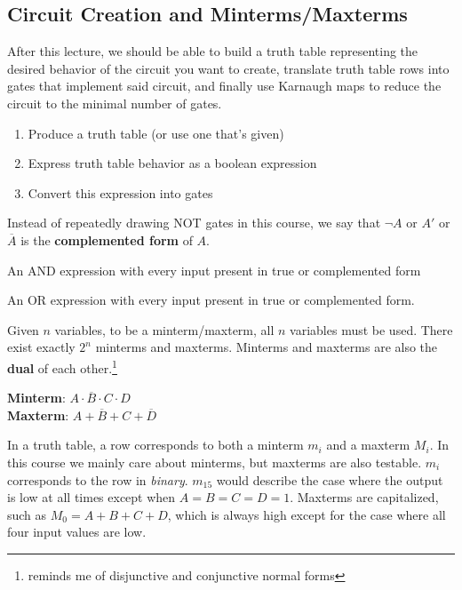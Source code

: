 \subsection{Circuit Creation and Minterms/Maxterms} \label{part:5stepplan}

After this lecture, we should be able to build a truth table representing the desired behavior of the circuit you want to create, translate truth table rows into gates that implement said circuit, and finally use Karnaugh maps to reduce the circuit to the minimal number of gates.
\begin{enumerate}
    \item Produce a truth table (or use one that's given)
    \item Express truth table behavior as a boolean expression
    \item Convert this expression into gates
\end{enumerate}

Instead of repeatedly drawing NOT gates in this course, we say that $\neg A$ or $A'$ or $\overline{A}$ is the \textbf{complemented form} of $A$.

\begin{definition}[Minterm]
An AND expression with every input present in true or complemented form
\end{definition}
\begin{definition}[Maxterm]
An OR expression with every input present in true or complemented form.
\end{definition}

Given $n$ variables, to be a minterm/maxterm, all $n$ variables must be used. There exist exactly $2^n$ minterms and maxterms. Minterms and maxterms are also the \textbf{dual} of each other.\footnote{reminds me of disjunctive and conjunctive normal forms}

\begin{example}
    \textbf{Minterm}: $A \cdot \overline{B} \cdot C \cdot D$ \\ 
    \textbf{Maxterm}: $A + \overline{B} + C + \overline{D}$
\end{example}

In a truth table, a row corresponds to both a minterm $m_i$ and a maxterm $M_i$. In this course we mainly care about minterms, but maxterms are also testable. $m_i$ corresponds to the row in \textit{binary}. $m_{15}$ would describe the case where the output is low at all times except when $A = B = C = D = 1$. Maxterms are capitalized, such as $M_0 = A+B+C+D$, which is always high except for the case where all four input values are low.

